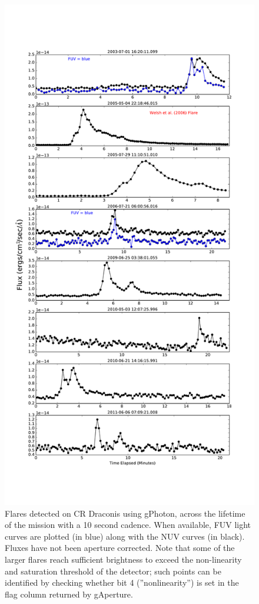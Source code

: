 \documentclass[iop]{emulateapj}
\begin{document}
\begin{figure}[h]
\includegraphics[scale=0.35]{Fig13.pdf}
\caption{Flares detected on CR Draconis using gPhoton, across the lifetime of the mission with a 10 second cadence. When available, FUV light curves are plotted (in blue) along with the NUV curves (in black). Fluxes have not been aperture corrected. Note that some of the larger flares reach sufficient brightness to exceed the non-linearity and saturation threshold of the detector; such points can be identified by checking whether bit 4 (''nonlinearity'') is set in the flag column returned by gAperture.
\label{crdraflares}}
\end{figure}
\end{document}
